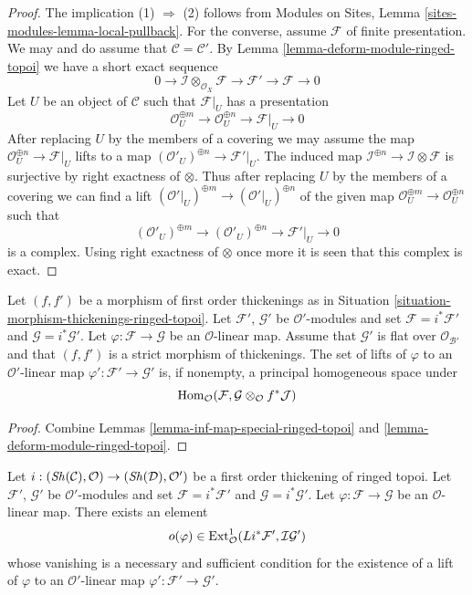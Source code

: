 \begin{proof}
The implication (1) $\Rightarrow$ (2) follows from
Modules on Sites, Lemma \ref{sites-modules-lemma-local-pullback}.
For the converse, assume $\mathcal{F}$ of finite presentation.
We may and do assume that $\mathcal{C} = \mathcal{C}'$.
By Lemma \ref{lemma-deform-module-ringed-topoi} we have a short exact sequence
$$
0 \to \mathcal{I} \otimes_{\mathcal{O}_X} \mathcal{F} \to
\mathcal{F}' \to \mathcal{F} \to 0
$$
Let $U$ be an object of $\mathcal{C}$ such that $\mathcal{F}|_U$ has a
presentation
$$
\mathcal{O}_U^{\oplus m} \to \mathcal{O}_U^{\oplus n} \to \mathcal{F}|_U \to 0
$$
After replacing $U$ by the members of a covering we may assume the
map $\mathcal{O}_U^{\oplus n} \to \mathcal{F}|_U$ lifts to a map
$(\mathcal{O}'_U)^{\oplus n} \to \mathcal{F}'|_U$. The induced map
$\mathcal{I}^{\oplus n} \to \mathcal{I} \otimes \mathcal{F}$ is
surjective by right exactness of $\otimes$. Thus after replacing $U$
by the members of a covering we can find a lift
$(\mathcal{O}'|_U)^{\oplus m} \to (\mathcal{O}'|_U)^{\oplus n}$
of the given map $\mathcal{O}_U^{\oplus m} \to \mathcal{O}_U^{\oplus n}$
such that
$$
(\mathcal{O}'_U)^{\oplus m} \to (\mathcal{O}'_U)^{\oplus n} \to
\mathcal{F}'|_U \to 0
$$
is a complex. Using right exactness of $\otimes$ once more it is seen
that this complex is exact.
\end{proof}

\begin{lemma}
\label{lemma-inf-map-rel-ringed-topoi}
Let $(f, f')$ be a morphism of first order thickenings as in
Situation \ref{situation-morphism-thickenings-ringed-topoi}.
Let $\mathcal{F}'$, $\mathcal{G}'$ be $\mathcal{O}'$-modules and set
$\mathcal{F} = i^*\mathcal{F}'$ and $\mathcal{G} = i^*\mathcal{G}'$.
Let $\varphi : \mathcal{F} \to \mathcal{G}$ be an $\mathcal{O}$-linear map.
Assume that $\mathcal{G}'$ is flat over $\mathcal{O}_{\mathcal{B}'}$ and that
$(f, f')$ is a strict morphism of thickenings.
The set of lifts of $\varphi$ to an $\mathcal{O}'$-linear map
$\varphi' : \mathcal{F}' \to \mathcal{G}'$ is, if nonempty, a principal
homogeneous space under
$$
\mathop{\mathrm{Hom}}\nolimits_\mathcal{O}(\mathcal{F},
\mathcal{G} \otimes_\mathcal{O} f^*\mathcal{J})
$$
\end{lemma}

\begin{proof}
Combine Lemmas \ref{lemma-inf-map-special-ringed-topoi} and
\ref{lemma-deform-module-ringed-topoi}.
\end{proof}

\begin{lemma}
\label{lemma-inf-obs-map-special-ringed-topoi}
Let $i : (\mathop{\mathit{Sh}}\nolimits(\mathcal{C}), \mathcal{O}) \to (\mathop{\mathit{Sh}}\nolimits(\mathcal{D}), \mathcal{O}')$
be a first order thickening of ringed topoi.
Let $\mathcal{F}'$, $\mathcal{G}'$ be $\mathcal{O}'$-modules and set
$\mathcal{F} = i^*\mathcal{F}'$ and $\mathcal{G} = i^*\mathcal{G}'$.
Let $\varphi : \mathcal{F} \to \mathcal{G}$ be an $\mathcal{O}$-linear map.
There exists an element
$$
o(\varphi) \in
\mathop{\mathrm{Ext}}\nolimits^1_\mathcal{O}(Li^*\mathcal{F}', \mathcal{I}\mathcal{G}')
$$
whose vanishing is a necessary and sufficient condition for the
existence of a lift of $\varphi$ to an $\mathcal{O}'$-linear map
$\varphi' : \mathcal{F}' \to \mathcal{G}'$.
\end{lemma}

